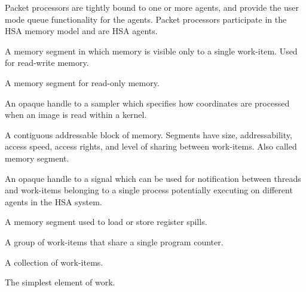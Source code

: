 \documentclass[final,oneside]{book}
\begin{document}
\begin{description}[itemsep=5pt,leftmargin=0cm, labelindent=0cm]
\item[Packet processor] Packet processors are tightly bound to one or more
  agents, and provide the user mode queue functionality for the agents. Packet
  processors participate in the HSA memory model and are HSA agents.

\item[Private segment] A memory segment in which memory is visible only to a
  single work-item. Used for read-write memory.

\item[Readonly segment] A memory segment for read-only memory.

\item[Sampler handle] An opaque handle to a sampler which specifies how
  coordinates are processed when an image is read within a kernel.

\item[Segment] A contiguous addressable block of memory. Segments have size,
  addressability, access speed, access rights, and level of sharing between
  work-items. Also called memory segment.

\item[Signal (handle)] An opaque handle to a signal which can be used for
  notification between threads and work-items belonging to a single process
  potentially executing on different agents in the HSA system.

\item[Spill segment] A memory segment used to load or store register spills.

\item[Wavefront] A group of work-items that share a single program counter.

\item[Work-group] A collection of work-items.

\item[Work-item] The simplest element of work.

\end{description}

\newpage
{}
\printindex[api]
\printindex[ext]


\begin{thebibliography}{30}



\end{thebibliography}
\end{document}
